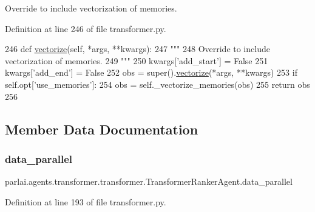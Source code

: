 \begin{DoxyVerb}Override to include vectorization of memories.
\end{DoxyVerb}
 

Definition at line 246 of file transformer.\+py.


\begin{DoxyCode}
246     \textcolor{keyword}{def }\hyperlink{namespaceparlai_1_1agents_1_1drqa_1_1utils_a5c76cc39e3014c7bcf9199d566dbdc0f}{vectorize}(self, *args, **kwargs):
247         \textcolor{stringliteral}{"""}
248 \textcolor{stringliteral}{        Override to include vectorization of memories.}
249 \textcolor{stringliteral}{        """}
250         kwargs[\textcolor{stringliteral}{'add\_start'}] = \textcolor{keyword}{False}
251         kwargs[\textcolor{stringliteral}{'add\_end'}] = \textcolor{keyword}{False}
252         obs = super().\hyperlink{namespaceparlai_1_1agents_1_1drqa_1_1utils_a5c76cc39e3014c7bcf9199d566dbdc0f}{vectorize}(*args, **kwargs)
253         \textcolor{keywordflow}{if} self.opt[\textcolor{stringliteral}{'use\_memories'}]:
254             obs = self.\_vectorize\_memories(obs)
255         \textcolor{keywordflow}{return} obs
256 
\end{DoxyCode}


\subsection{Member Data Documentation}
\mbox{\label{classparlai_1_1agents_1_1transformer_1_1transformer_1_1TransformerRankerAgent_a1698ffc6dff7a16e6ea4835b1463266c}} 
\subsubsection{\texorpdfstring{data\+\_\+parallel}{data\_parallel}}
{\footnotesize\ttfamily parlai.\+agents.\+transformer.\+transformer.\+Transformer\+Ranker\+Agent.\+data\+\_\+parallel}



Definition at line 193 of file transformer.\+py.

